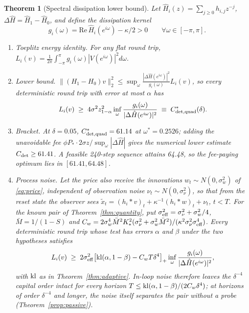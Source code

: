 \documentclass[12pt]{article}
\newtheorem{theorem}{Theorem}[section]
\theoremstyle{definition}
\theoremstyle{remark}
\begin{document}
\begin{theorem}[Spectral dissipation lower bound]\label{thm:spectral}
Let $\hat H_i(z)=\sum_{j\ge0}h_{i,j}z^{-j}$, $\Delta\hat H=\hat H_1-\hat H_0$, and define the dissipation kernel
\begin{equation}\label{eq:gdiss}
g_i(\omega)=\mathrm{Re}\,\hat H_i(e^{i\omega})-\kappa/2>0\qquad\forall\omega\in[-\pi,\pi].
\end{equation}
\begin{enumerate}[label=(\roman*)]
\item \emph{Toeplitz energy identity.} For any flat round trip, $L_i(v)=\frac1{2\pi}\int_{-\pi}^{\pi}g_i(\omega)|V(e^{i\omega})|^2d\omega$.
\item \emph{Lower bound.} $\|(H_1-H_0)v\|_2^2\le\sup_\omega\frac{|\Delta\hat H(e^{i\omega})|^2}{g_i(\omega)}L_i(v)$, so every deterministic round trip with error at most $\alpha$ has
\begin{equation}\label{eq:Cdet}
L_i(v)\;\ge\;4\sigma^2z_{1-\alpha}^2\inf_\omega\frac{g_i(\omega)}{|\Delta\hat H(e^{i\omega})|^2}\;\equiv\;C^*_{\rm det,quad}(\delta).
\end{equation}
\item \emph{Bracket.} At $\delta=0.05$, $C^*_{\rm det,quad}=61.14$ at $\omega^*=0.2526$; adding the unavoidable fee $\phi P_*\cdot2\sigma z/\sup_\omega|\Delta\hat H|$ gives the numerical lower estimate $C_{\rm det}\ge61.41$. A feasible 240-step sequence attains 64.48, so the fee-paying optimum lies in $[61.41,64.48]$.
\item \emph{Process noise.} Let the price also receive the innovations $w_t\sim N(0,\sigma_w^2)$ of \eqref{eq:price}, independent of observation noise $\nu_t\sim N(0,\sigma_\nu^2)$, so that from the reset state the observer sees $\tilde x_t=(h_i*v)_t+\kappa^{-1}(h_i*w)_t+\nu_t$, $t<T$. For the known pair of Theorem~\ref{thm:quantity}, put $\sigma_{\rm eff}^2=\sigma_\nu^2+\sigma_w^2/4$, $\bar M=1/(1-S)$ and $C_w=2\sigma_w^4\bar M^2K_*^2(\sigma_\nu^2+\sigma_w^2\bar M^2)/(\kappa^2\sigma_\nu^2\sigma_{\rm eff}^4)$. Every deterministic round trip whose test has errors $\alpha$ and $\beta$ under the two hypotheses satisfies
\begin{equation}\label{eq:Cnoise}
L_i(v)\;\ge\;2\sigma_{\rm eff}^2\bigl[{\rm kl}(\alpha,1-\beta)-C_wT\delta^4\bigr]_+\inf_\omega\frac{g_i(\omega)}{|\Delta\hat H(e^{i\omega})|^2},
\end{equation}
with ${\rm kl}$ as in Theorem~\ref{thm:adaptive}. In-loop noise therefore leaves the $\delta^{-4}$ capital order intact for every horizon $T\le{\rm kl}(\alpha,1-\beta)/(2C_w\delta^4)$; at horizons of order $\delta^{-4}$ and longer, the noise itself separates the pair without a probe (Theorem~\ref{prop:passive}).
\end{enumerate}
\end{theorem}
\end{document}
